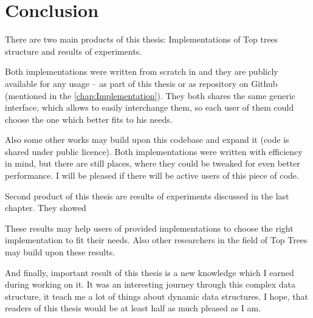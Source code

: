 \chapter*{Conclusion}

There are two main products of this thesis: Implementations of Top trees
structure and results of experiments.

Both implementations were written from scratch in \Cpp{} and they are publicly
available for any usage -- as part of this thesis or as repository on Github
(mentioned in the \cref{chap:Implementation}). They both shares the same generic
interface, which allows to easily interchange them, so each user of them could
choose the one which better fits to his needs.

Also some other works may build upon this codebase and expand it (code is shared
under public licence). Both implementations were written with efficiency in
mind, but there are still places, where they could be tweaked for even better
performance. I will be pleased if there will be active users of this piece of
code.

\bigskip

Second product of this thesis are results of experiments discussed in the last
chapter. They showed 

These results may help users of provided implementations to choose the right
implementation to fit their needs. Also other researchers in the field of Top
Trees may build upon these results.

\bigskip

And finally, important result of this thesis is a new knowledge which I earned
during working on it. It was an interesting journey through this complex data
structure, it teach me a lot of things about dynamic data structures. I hope,
that readers of this thesis would be at least half as much pleased as I am.
